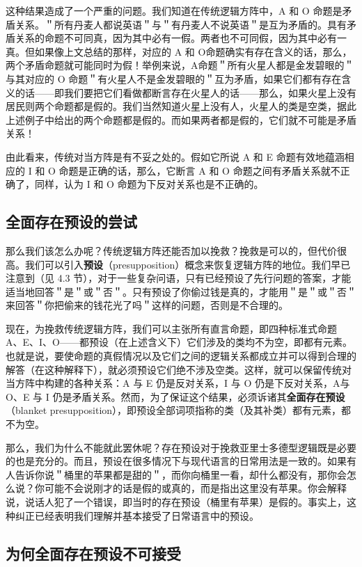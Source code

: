 \begin{logicbox}[title=章节导读]
这种结果造成了一个严重的问题。我们知道在传统逻辑方阵中，A 和 O 命题是矛盾关系。＂所有丹麦人都说英语＂与＂有丹麦人不说英语＂是互为矛盾的。具有矛盾关系的命题不可同真，因为其中必有一假。两者也不可同假，因为其中必有一真。但如果像上文总结的那样，对应的 A 和 O命题确实有存在含义的话，那么，两个矛盾命题就可能同时为假！举例来说，A命题＂所有火星人都是金发碧眼的＂与其对应的 O 命题＂有火星人不是金发碧眼的＂互为矛盾，如果它们都有存在含义的话——即我们要把它们看做都断言存在火星人的话——那么，如果火星上没有居民则两个命题都是假的。我们当然知道火星上没有人，火星人的类是空类，据此上述例子中给出的两个命题都是假的。而如果两者都是假的，它们就不可能是矛盾关系！

由此看来，传统对当方阵是有不妥之处的。假如它所说 A 和 E 命题有效地蕴涵相应的 I 和 O 命题是正确的话，那么，它断言 A 和 O 命题之间有矛盾关系就不正确了，同样，认为 I 和 O 命题为下反对关系也是不正确的。

\subsection{全面存在预设的尝试}

那么我们该怎么办呢？传统逻辑方阵还能否加以挽救？挽救是可以的，但代价很高。我们可以引入\textbf{预设}（presupposition）概念来恢复逻辑方阵的地位。我们早已注意到（见 4.3 节），对于一些复杂问语，只有已经预设了先行问题的答案，才能适当地回答＂是＂或＂否＂。只有预设了你偷过钱是真的，才能用＂是＂或＂否＂来回答＂你把偷来的钱花光了吗＂这样的问题，否则是不合理的。

现在，为挽救传统逻辑方阵，我们可以主张所有直言命题，即四种标准式命题 A、E、I、O——都预设（在上述含义下）它们涉及的类均不为空，即都有元素。也就是说，要使命题的真假情况以及它们之间的逻辑关系都成立并可以得到合理的解答（在这种解释下），就必须预设它们绝不涉及空类。这样，就可以保留传统对当方阵中构建的各种关系：A 与 E 仍是反对关系，I 与 O 仍是下反对关系，A与 O、E 与 I 仍是矛盾关系。然而，为了保证这个结果，必须诉诸其\textbf{全面存在预设}（blanket presupposition），即预设全部词项指称的类（及其补类）都有元素，都不为空。\cite{wiebe1991}

那么，我们为什么不能就此罢休呢？存在预设对于挽救亚里士多德型逻辑既是必要的也是充分的。而且，预设在很多情况下与现代语言的日常用法是一致的。如果有人告诉你说＂桶里的苹果都是甜的＂，而你向桶里一看，却什么都没有，那你会怎么说？你可能不会说刚才的话是假的或真的，而是指出这里没有苹果。你会解释说，说话人犯了一个错误，即当时的存在预设（桶里有苹果）是假的。事实上，这种纠正已经表明我们理解并基本接受了日常语言中的预设。

\subsection{为何全面存在预设不可接受}


\end{logicbox}

